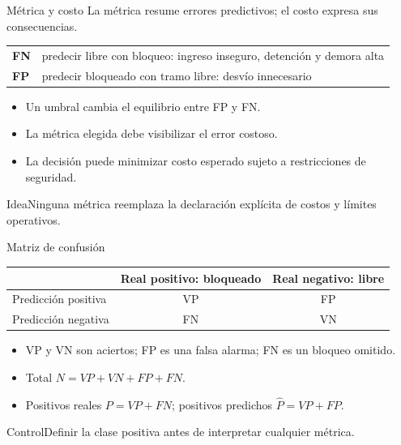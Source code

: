 \documentclass[aspectratio=169,10pt]{beamer}
\begin{document}
\begin{frame}{Métrica y costo}
  \small La métrica resume errores predictivos; el costo expresa sus consecuencias.
  \begin{tabularx}{\textwidth}{>{\bfseries}p{}X}\toprule
  FN & predecir libre con bloqueo: ingreso inseguro, detención y demora alta\\
  FP & predecir bloqueado con tramo libre: desvío innecesario\\\bottomrule
  \end{tabularx}
  \begin{itemize}
    \item Un umbral cambia el equilibrio entre FP y FN.
    \item La métrica elegida debe visibilizar el error costoso.
    \item La decisión puede minimizar costo esperado sujeto a restricciones de seguridad.
  \end{itemize}
  \begin{block}{Idea}Ninguna métrica reemplaza la declaración explícita de costos y límites operativos.\end{block}
\end{frame}

\begin{frame}{Matriz de confusión}
  \small
  \begin{center}\begin{tabular}{lcc}\toprule
   & Real positivo: bloqueado & Real negativo: libre\\\midrule
  Predicción positiva & VP & FP\\ Predicción negativa & FN & VN\\\bottomrule
  \end{tabular}\end{center}
  \begin{itemize}
    \item VP y VN son aciertos; FP es una falsa alarma; FN es un bloqueo omitido.
    \item Total $N=VP+VN+FP+FN$.
    \item Positivos reales $P=VP+FN$; positivos predichos $\hat P=VP+FP$.
  \end{itemize}
  \begin{alertblock}{Control}Definir la clase positiva antes de interpretar cualquier métrica.\end{alertblock}
\end{frame}
\end{document}
